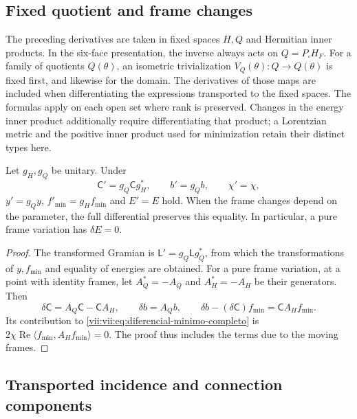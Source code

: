 \subsection{Fixed quotient and frame changes}
\label{vii:vii:subsec:marcos-minimo}

The preceding derivatives are taken in fixed spaces \(H,Q\) and Hermitian
inner products. In the six-face presentation, the inverse always
acts on \(Q=P_\square H_F\). For a family of quotients
\(Q(\theta)\), an isometric trivialization
\(V_Q(\theta):Q\to Q(\theta)\) is fixed first, and likewise for the domain.
The derivatives of those maps are included when differentiating the expressions
transported to the fixed spaces. The formulas apply on each
open set where rank is preserved. Changes in the energy inner product
additionally require differentiating that product; a Lorentzian metric
and the positive inner product used for minimization retain their distinct
types here.

\begin{proposition}
\label{vii:vii:prop:covariancia-minimo}
Let \(g_H,g_Q\) be unitary. Under
\[
 \mathsf C'=g_Q\mathsf C g_H^*,\qquad b'=g_Qb,\qquad \chi'=\chi,
\]
\(y'=g_Qy\), \(f'_{\min}=g_Hf_{\min}\) and \(E'=E\) hold. When the frame changes depend on the parameter, the full differential preserves this equality. In particular, a pure frame variation has \(\delta E=0\).
\end{proposition}

\begin{proof}
The transformed Gramian is \(\mathsf L'=g_Q\mathsf Lg_Q^*\), from which the transformations of \(y,f_{\min}\) and equality of energies are obtained. For a pure frame variation, at a point with identity frames, let \(A_Q^*=-A_Q\) and \(A_H^*=-A_H\) be their generators. Then
\[
 \delta\mathsf C=A_Q\mathsf C-\mathsf C A_H,\qquad
 \delta b=A_Qb,\qquad
 \delta b-(\delta\mathsf C)f_{\min}=\mathsf C A_Hf_{\min}.
\]
Its contribution to \eqref{vii:vii:eq:diferencial-minimo-completo} is \(2\chi\operatorname{Re}\langle f_{\min},A_Hf_{\min}\rangle=0\). The proof thus includes the terms due to the moving frames.
\end{proof}

\subsection{Transported incidence and connection components}
\label{vii:vii:subsec:incidencia-conexion-minima}

